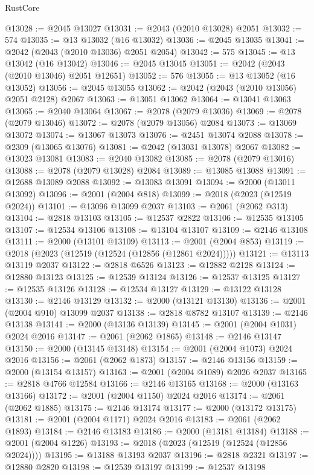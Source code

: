 \begin{lexlean}{RustCore}
\begin{coremodule}
@13028 := @2045 @13027
@13031 := @2043 (@2010 @13028) @2051
@13032 := 574
@13035 := @13 @13032 (@16 @13032)
@13036 := @2045 @13035
@13041 := @2042 (@2043 (@2010 @13036) @2051 @2054)
@13042 := 575
@13045 := @13 @13042 (@16 @13042)
@13046 := @2045 @13045
@13051 := @2042 (@2043 (@2010 @13046) @2051 @12651)
@13052 := 576
@13055 := @13 @13052 (@16 @13052)
@13056 := @2045 @13055
@13062 := @2042 (@2043 (@2010 @13056) @2051 @2128) @2067
@13063 := @13051 @13062
@13064 := @13041 @13063
@13065 := @2040 @13064
@13067 := @2078 (@2079 @13036)
@13069 := @2078 (@2079 @13046)
@13072 := @2078 (@2079 @13056) @2084
@13073 := @13069 @13072
@13074 := @13067 @13073
@13076 := @2451 @13074 @2088
@13078 := @2309 (@13065 @13076)
@13081 := @2042 (@13031 @13078) @2067
@13082 := @13023 @13081
@13083 := @2040 @13082
@13085 := @2078 (@2079 @13016)
@13088 := @2078 (@2079 @13028) @2084
@13089 := @13085 @13088
@13091 := @12688 @13089 @2088
@13092 := @13083 @13091
@13094 := @2000 (@13011 @13092)
@13096 := @2001 (@2004 @818)
@13099 := @2018 (@2023 (@12519 @2024))
@13101 := @13096 @13099 @2037
@13103 := @2061 (@2062 @313)
@13104 := @2818 @13103
@13105 := @12537 @2822
@13106 := @12535 @13105
@13107 := @12534 @13106
@13108 := @13104 @13107
@13109 := @2146 @13108
@13111 := @2000 (@13101 @13109)
@13113 := @2001 (@2004 @853)
@13119 := @2018 (@2023 (@12519 (@12524 (@12856 (@12861 @2024)))))
@13121 := @13113 @13119 @2037
@13122 := @2818 @6526
@13123 := @12882 @2128
@13124 := @12880 @13123
@13125 := @12539 @13124
@13126 := @12537 @13125
@13127 := @12535 @13126
@13128 := @12534 @13127
@13129 := @13122 @13128
@13130 := @2146 @13129
@13132 := @2000 (@13121 @13130)
@13136 := @2001 (@2004 @910) @13099 @2037
@13138 := @2818 @8782 @13107
@13139 := @2146 @13138
@13141 := @2000 (@13136 @13139)
@13145 := @2001 (@2004 @1031) @2024 @2016
@13147 := @2061 (@2062 @1865)
@13148 := @2146 @13147
@13150 := @2000 (@13145 @13148)
@13154 := @2001 (@2004 @1073) @2024 @2016
@13156 := @2061 (@2062 @1873)
@13157 := @2146 @13156
@13159 := @2000 (@13154 @13157)
@13163 := @2001 (@2004 @1089) @2026 @2037
@13165 := @2818 @4766 @12584
@13166 := @2146 @13165
@13168 := @2000 (@13163 @13166)
@13172 := @2001 (@2004 @1150) @2024 @2016
@13174 := @2061 (@2062 @1885)
@13175 := @2146 @13174
@13177 := @2000 (@13172 @13175)
@13181 := @2001 (@2004 @1171) @2024 @2016
@13183 := @2061 (@2062 @1893)
@13184 := @2146 @13183
@13186 := @2000 (@13181 @13184)
@13188 := @2001 (@2004 @1226)
@13193 := @2018 (@2023 (@12519 (@12524 (@12856 @2024))))
@13195 := @13188 @13193 @2037
@13196 := @2818 @2321
@13197 := @12880 @2820
@13198 := @12539 @13197
@13199 := @12537 @13198

\end{coremodule}
\end{lexlean}
